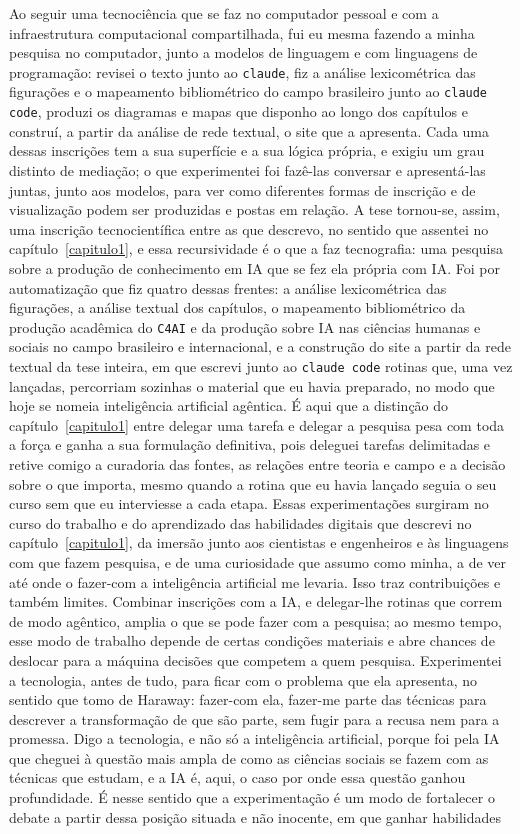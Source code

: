 Ao seguir uma tecnociência que se faz no computador pessoal e com a infraestrutura computacional compartilhada, fui eu mesma fazendo a minha pesquisa no computador, junto a modelos de linguagem e com linguagens de programação: revisei o texto junto ao \texttt{claude}, fiz a análise lexicométrica das figurações e o mapeamento bibliométrico do campo brasileiro junto ao \texttt{claude code}, produzi os diagramas e mapas que disponho ao longo dos capítulos e construí, a partir da análise de rede textual, o site que a apresenta. Cada uma dessas inscrições tem a sua superfície e a sua lógica própria, e exigiu um grau distinto de mediação; o que experimentei foi fazê-las conversar e apresentá-las juntas, junto aos modelos, para ver como diferentes formas de inscrição e de visualização podem ser produzidas e postas em relação. A tese tornou-se, assim, uma inscrição tecnocientífica entre as que descrevo, no sentido que assentei no capítulo~\ref{capitulo1}, e essa recursividade é o que a faz tecnografia: uma pesquisa sobre a produção de conhecimento em IA que se fez ela própria com IA. Foi por automatização que fiz quatro dessas frentes: a análise lexicométrica das figurações, a análise textual dos capítulos, o mapeamento bibliométrico da produção acadêmica do \texttt{C4AI} e da produção sobre IA nas ciências humanas e sociais no campo brasileiro e internacional, e a construção do site a partir da rede textual da tese inteira, em que escrevi junto ao \texttt{claude code} rotinas que, uma vez lançadas, percorriam sozinhas o material que eu havia preparado, no modo que hoje se nomeia inteligência artificial agêntica. É aqui que a distinção do capítulo~\ref{capitulo1} entre delegar uma tarefa e delegar a pesquisa pesa com toda a força e ganha a sua formulação definitiva, pois deleguei tarefas delimitadas e retive comigo a curadoria das fontes, as relações entre teoria e campo e a decisão sobre o que importa, mesmo quando a rotina que eu havia lançado seguia o seu curso sem que eu interviesse a cada etapa. Essas experimentações surgiram no curso do trabalho e do aprendizado das habilidades digitais que descrevi no capítulo~\ref{capitulo1}, da imersão junto aos cientistas e engenheiros e às linguagens com que fazem pesquisa, e de uma curiosidade que assumo como minha, a de ver até onde o fazer-com a inteligência artificial me levaria. Isso traz contribuições e também limites. Combinar inscrições com a IA, e delegar-lhe rotinas que correm de modo agêntico, amplia o que se pode fazer com a pesquisa; ao mesmo tempo, esse modo de trabalho depende de certas condições materiais e abre chances de deslocar para a máquina decisões que competem a quem pesquisa. Experimentei a tecnologia, antes de tudo, para ficar com o problema que ela apresenta, no sentido que tomo de Haraway: fazer-com ela, fazer-me parte das técnicas para descrever a transformação de que são parte, sem fugir para a recusa nem para a promessa. Digo a tecnologia, e não só a inteligência artificial, porque foi pela IA que cheguei à questão mais ampla de como as ciências sociais se fazem com as técnicas que estudam, e a IA é, aqui, o caso por onde essa questão ganhou profundidade. É nesse sentido que a experimentação é um modo de fortalecer o debate a partir dessa posição situada e não inocente, em que ganhar habilidades 
